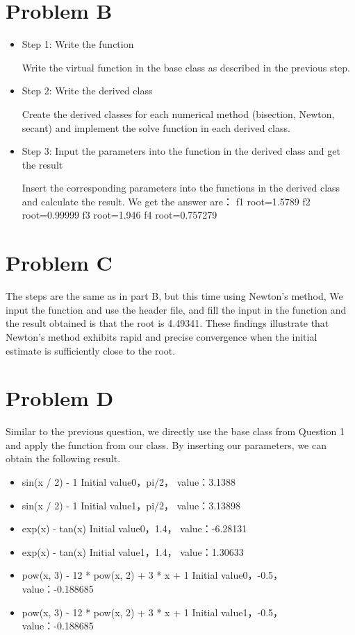 \documentclass{article}
\begin{document}
\section*{Problem B}

\begin{itemize}
Use the code designed in Question 1 as the virtual function, then input the corresponding data to form the required answer.

    \item  Step 1: Write the function

Write the virtual function in the base class as described in the previous step.

    \item  Step 2: Write the derived class

Create the derived classes for each numerical method (bisection, Newton, secant) and implement the solve function in each derived class.

    \item  Step 3: Input the parameters into the function in the derived class and get the result

Insert the corresponding parameters into the functions in the derived class and calculate the result.
We get the answer are：
f1 root=1.5789
f2 root=0.99999
f3 root=1.946
f4 root=0.757279
\end{itemize}


\section*{Problem C}

The steps are the same as in part B, but this time using Newton's method, 
We input the function and use the header file, and fill the input in the function and the result obtained is that the root is 4.49341.
These findings illustrate that Newton's method exhibits rapid and precise convergence when the initial estimate is sufficiently close to the root.

\section*{Problem D}

Similar to the previous question, we directly use the base class from Question 1 and apply the function from our class. By inserting our parameters, we can obtain the following result.
\begin{itemize}
    \item sin(x / 2) - 1 Initial value0，pi/2， value：3.1388
    \item sin(x / 2) - 1 Initial value1，pi/2， value：3.13898
    \item exp(x) - tan(x) Initial value0，1.4， value：-6.28131
    \item exp(x) - tan(x) Initial value1，1.4， value：1.30633
    \item pow(x, 3) - 12 * pow(x, 2) + 3 * x + 1 Initial value0，-0.5， value：-0.188685
    \item pow(x, 3) - 12 * pow(x, 2) + 3 * x + 1 Initial value1，-0.5， value：-0.188685
\end{itemize}
\end{document}
